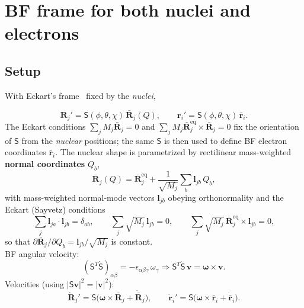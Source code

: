 \section{BF frame for both nuclei and electrons}

\subsection{Setup}

With Eckart's frame~\cite{eckart1935} fixed by the \emph{nuclei},

\begin{equation}
\mathbf{R}_j'=\mathsf{S}(\phi,\theta,\chi)\,\bar{\mathbf{R}}_j(Q),\qquad \mathbf{r}_i'=\mathsf{S}(\phi,\theta,\chi)\,\bar{\mathbf{r}}_i. \tag{3.1}
\end{equation}
The Eckart conditions $\sum_j M_j\bar{\mathbf{R}}_j=0$ and $\sum_j M_j\bar{\mathbf{R}}_j^{\mathrm{eq}}\!\times\bar{\mathbf{R}}_j=0$ fix the orientation of $\mathsf{S}$ from the \emph{nuclear} positions; the same $\mathsf{S}$ is then used to define BF electron coordinates $\bar{\mathbf{r}}_i$. The nuclear shape is parametrized by rectilinear mass-weighted \textbf{normal coordinates} $Q_b$,
\begin{equation}
\bar{\mathbf{R}}_j(Q) = \bar{\mathbf{R}}_j^{\mathrm{eq}} + \frac{1}{\sqrt{M_j}}\sum_{b}\mathbf{l}_{jb}\,Q_b , \tag{3.1a}
\end{equation}
with mass-weighted normal-mode vectors $\mathbf{l}_{jb}$ obeying orthonormality and the Eckart (Sayvetz) conditions~\cite{eckart1935,sayvetz1939}
\begin{equation}
\sum_j \mathbf{l}_{ja}\!\cdot\!\mathbf{l}_{jb}=\delta_{ab},\qquad
\sum_j\sqrt{M_j}\,\mathbf{l}_{jb}=0,\qquad
\sum_j\sqrt{M_j}\,\bar{\mathbf{R}}_j^{\mathrm{eq}}\!\times\!\mathbf{l}_{jb}=0 , \tag{3.1b}
\end{equation}
so that $\partial\bar{\mathbf{R}}_j/\partial Q_b=\mathbf{l}_{jb}/\sqrt{M_j}$ is constant. \\
BF angular velocity:
\begin{equation}
(\mathsf{S}^T\dot{\mathsf{S}})_{\alpha\beta}=-\epsilon_{\alpha\beta\gamma}\,\omega_\gamma \Longrightarrow \mathsf{S}^T\dot{\mathsf{S}}\,\mathbf{v}=\boldsymbol{\omega}\times\mathbf{v}. \tag{3.2}
\end{equation}
Velocities (using $|\mathsf{S}\mathbf{v}|^2=|\mathbf{v}|^2$):
\begin{equation}
\dot{\mathbf{R}}_j'=\mathsf{S}\bigl(\boldsymbol{\omega}\!\times\!\bar{\mathbf{R}}_j+\dot{\bar{\mathbf{R}}}_j\bigr),\qquad \dot{\mathbf{r}}_i'=\mathsf{S}\bigl(\boldsymbol{\omega}\!\times\!\bar{\mathbf{r}}_i+\dot{\bar{\mathbf{r}}}_i\bigr). \tag{3.3}
\end{equation}

